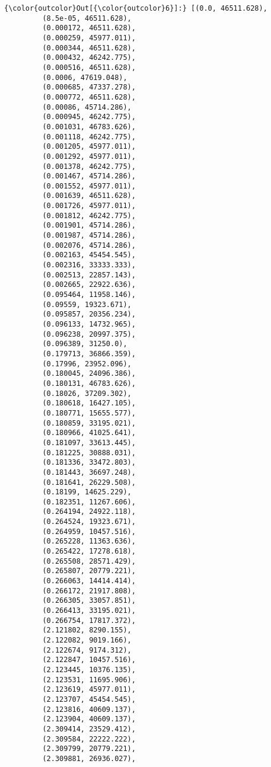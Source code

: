 \documentclass[11pt]{article}
\begin{document}
\begin{Verbatim}[commandchars=\\\{\}]
{\color{outcolor}Out[{\color{outcolor}6}]:} [(0.0, 46511.628),
         (8.5e-05, 46511.628),
         (0.000172, 46511.628),
         (0.000259, 45977.011),
         (0.000344, 46511.628),
         (0.000432, 46242.775),
         (0.000516, 46511.628),
         (0.0006, 47619.048),
         (0.000685, 47337.278),
         (0.000772, 46511.628),
         (0.00086, 45714.286),
         (0.000945, 46242.775),
         (0.001031, 46783.626),
         (0.001118, 46242.775),
         (0.001205, 45977.011),
         (0.001292, 45977.011),
         (0.001378, 46242.775),
         (0.001467, 45714.286),
         (0.001552, 45977.011),
         (0.001639, 46511.628),
         (0.001726, 45977.011),
         (0.001812, 46242.775),
         (0.001901, 45714.286),
         (0.001987, 45714.286),
         (0.002076, 45714.286),
         (0.002163, 45454.545),
         (0.002316, 33333.333),
         (0.002513, 22857.143),
         (0.002665, 22922.636),
         (0.095464, 11958.146),
         (0.09559, 19323.671),
         (0.095857, 20356.234),
         (0.096133, 14732.965),
         (0.096238, 20997.375),
         (0.096389, 31250.0),
         (0.179713, 36866.359),
         (0.17996, 23952.096),
         (0.180045, 24096.386),
         (0.180131, 46783.626),
         (0.18026, 37209.302),
         (0.180618, 16427.105),
         (0.180771, 15655.577),
         (0.180859, 33195.021),
         (0.180966, 41025.641),
         (0.181097, 33613.445),
         (0.181225, 30888.031),
         (0.181336, 33472.803),
         (0.181443, 36697.248),
         (0.181641, 26229.508),
         (0.18199, 14625.229),
         (0.182351, 11267.606),
         (0.264194, 24922.118),
         (0.264524, 19323.671),
         (0.264959, 10457.516),
         (0.265228, 11363.636),
         (0.265422, 17278.618),
         (0.265508, 28571.429),
         (0.265807, 20779.221),
         (0.266063, 14414.414),
         (0.266172, 21917.808),
         (0.266305, 33057.851),
         (0.266413, 33195.021),
         (0.266754, 17817.372),
         (2.121802, 8290.155),
         (2.122082, 9019.166),
         (2.122674, 9174.312),
         (2.122847, 10457.516),
         (2.123445, 10376.135),
         (2.123531, 11695.906),
         (2.123619, 45977.011),
         (2.123707, 45454.545),
         (2.123816, 40609.137),
         (2.123904, 40609.137),
         (2.309414, 23529.412),
         (2.309584, 22222.222),
         (2.309799, 20779.221),
         (2.309881, 26936.027),

\end{Verbatim}
\end{document}
